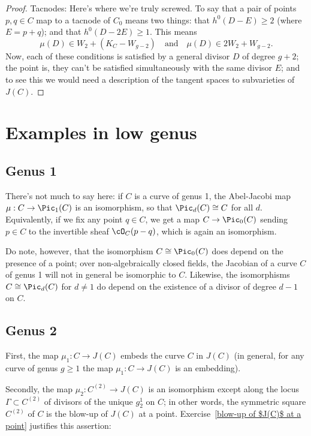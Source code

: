 \begin{proof}
Tacnodes: Here's where we're truly screwed. To say that a pair of points $p, q \in C$ map to a tacnode of $C_0$ means two things: that $h^0(D-E) \geq 2$ (where $E = p+q$); and that $h^0(D-2E) \geq 1$. This means
$$
\mu(D) \in W_2 + (K_C - W_{g-2}) \quad \text{and} \quad \mu(D) \in 2W_2 + W_{g-2}.
$$
Now, each of these conditions is satisfied by a general divisor $D$ of degree $g+2$; the point is, they can't be satisfied simultaneously with the same divisor $E$; and to see this we would need a description of the tangent spaces to subvarieties of $J(C)$.



\end{proof}

\section{Examples in low genus}

\subsection{Genus 1} 

There's not much to say here: if $C$ is a curve of genus 1, the Abel-Jacobi map $\mu : C \to \Pic_1(C)$ is an isomorphism, so that $\Pic_d(C) \cong C$ for all $d$. Equivalently, if we fix any point $q \in C$, we get a map $C \to \Pic_0(C)$ sending $p \in C$ to the invertible sheaf $\cO_C(p-q)$, which is again an isomorphism.

Do note, however, that the isomorphism $C \cong \Pic_0(C)$ does depend on the presence of a point; over non-algebraically closed fields, the Jacobian of a curve $C$ of genus 1 will not in general be isomorphic to $C$. Likewise, the isomorphisms $C \cong \Pic_d(C)$
for $d \neq 1$ do depend on the existence of a divisor of degree $d-1$ on $C$.

\subsection{Genus 2}

First, the map $\mu_1 : C \to J(C)$ embeds the curve $C$ in $J(C)$ (in general, for any curve of genus $g \geq 1$ the map $\mu_1 : C \to J(C)$ is an embedding). 

Secondly, the map $\mu_2 : C^{(2)} \to J(C)$ is an isomorphism except along the locus $\Gamma \subset  C^{(2)} $ of divisors of the unique $g^1_2$ on $C$; in other words, the symmetric square $ C^{(2)} $ of $C$ is the blow-up of $J(C)$ at a point. Exercise~\ref{blow-up of $J(C)$ at a point} justifies this assertion:


